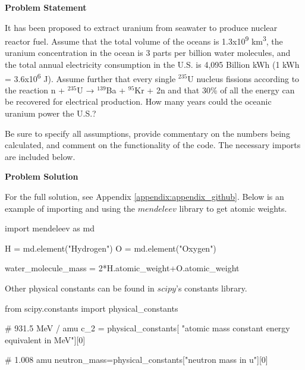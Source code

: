 \label{nuclear_assignment_1}

\begin{tcolorbox}[breakable, enhanced jigsaw, title=NE 495: Assignment \ref{nuclear_assignment_1}, 
    colframe=ksu-purple, colback=ksu-gray]

    \textbf{Problem Statement}
    \parindent15pt

    It has been proposed to extract uranium from seawater to produce nuclear reactor fuel. 
    Assume that the total volume of the oceans is 1.3x10\textsuperscript{9} km\textsuperscript{3}, the uranium 
    concentration in the ocean is 3 parts per billion water molecules, and the total annual 
    electricity consumption in the U.S. is 4,095 Billion kWh (1 kWh = 3.6x10\textsuperscript{6} J). Assume further 
    that every single ${}^{235}$U nucleus fissions according to the reaction n + ${}^{235}$U → ${}^{139}$Ba + ${}^{95}$Kr + 2n 
    and that 30\% of all the energy can be recovered for electrical production. How many years could the oceanic 
    uranium power the U.S.?

    Be sure to specify all assumptions, provide commentary on the numbers being calculated, and comment on the 
    functionality of the code. The necessary imports are included below.

    \tcblower
    \textbf{Problem Solution}
    \parindent15pt

    For the full solution, see Appendix \ref{appendix:appendix_github}. Below is an example of 
    importing and using the $mendeleev$ library to get atomic weights.

\begin{python}
import mendeleev as md

H = md.element("Hydrogen")
O = md.element("Oxygen")

water_molecule_mass = 2*H.atomic_weight+O.atomic_weight
\end{python}

Other physical constants can be found in $scipy$'s constants library.

\begin{python}
from scipy.constants import physical_constants

# 931.5 MeV / amu
c_2 = physical_constants[
    "atomic mass constant energy equivalent in MeV"][0]

# 1.008 amu
neutron_mass=physical_constants["neutron mass in u"][0]
\end{python}

\end{tcolorbox}

